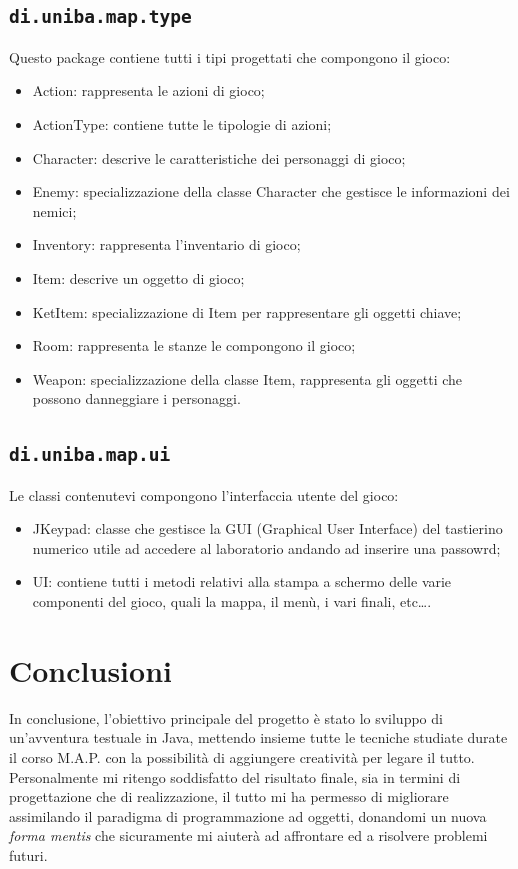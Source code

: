 \documentclass[italian,12pt,a4paper]{article}
\begin{document}
	\subsection{\texttt{di.uniba.map.type}}
	Questo package contiene tutti i tipi progettati che compongono il gioco:
	\begin{itemize}
		\item Action: rappresenta le azioni di gioco;
		\item ActionType: contiene tutte le tipologie di azioni;
		\item Character: descrive le caratteristiche dei personaggi di gioco;
		\item Enemy: specializzazione della classe Character che gestisce le informazioni dei nemici;
		\item Inventory: rappresenta l'inventario di gioco; 
		\item Item: descrive un oggetto di gioco;
		\item KetItem: specializzazione di Item per rappresentare gli oggetti chiave;
		\item Room: rappresenta le stanze le compongono il gioco;
		\item Weapon: specializzazione della classe Item, rappresenta gli oggetti che possono danneggiare i personaggi.
	\end{itemize}
	
	\subsection{\texttt{di.uniba.map.ui}}
	Le classi contenutevi compongono l'interfaccia utente del gioco: 
	\begin{itemize}
		\item JKeypad: classe che gestisce la GUI (Graphical User Interface) del tastierino numerico utile ad accedere al laboratorio andando ad inserire una passowrd;
		\item UI: contiene tutti i metodi relativi alla stampa a schermo delle varie componenti del gioco, quali la mappa, il menù, i vari finali, etc\dots.
	\end{itemize}
	\section{Conclusioni}
	
	In conclusione, l'obiettivo principale del progetto è stato lo sviluppo di un'avventura testuale in Java, mettendo insieme tutte le tecniche studiate durate il corso M.A.P. con la possibilità di aggiungere creatività per legare il tutto.\\
	\linebreak
	Personalmente mi ritengo soddisfatto del risultato finale, sia in termini di progettazione che di realizzazione, il tutto mi ha permesso di migliorare assimilando il paradigma di programmazione ad oggetti, donandomi un nuova \textit{forma mentis} che sicuramente mi aiuterà ad affrontare ed a risolvere problemi futuri. 
\end{document}

